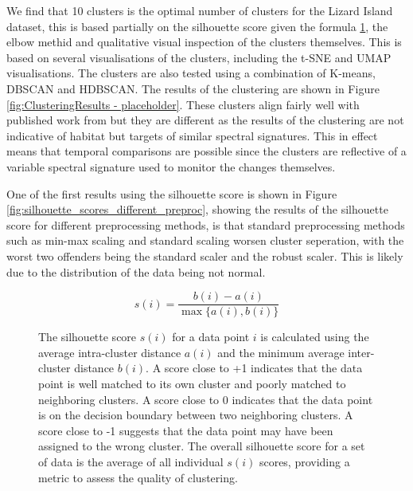 \documentclass[journal,article,submit,pdftex,moreauthors]{Definitions/mdpi}
\begin{document}
We find that 10 clusters is the optimal number of clusters for the Lizard Island dataset, this is based partially on the silhouette score \cite{rousseeuw1987silhouettes} given the formula \ref{fig:silhouette_score}, the elbow methid and qualitative visual inspection of the clusters themselves. This is based on several visualisations of the clusters, including the t-SNE and UMAP visualisations. 
The clusters are also tested using a combination of K-means, DBSCAN and HDBSCAN. The results of the clustering are shown in Figure \ref{fig:ClusteringResults - placeholder}. These clusters align fairly well with published work from \citep{Kennedy2021} but they are different
as the results of the clustering are not indicative of habitat but targets of similar spectral signatures. This in effect means that temporal comparisons are possible since the clusters are reflective of a variable spectral signature used to monitor the changes themselves.

One of the first results using the silhouette score is shown in Figure \ref{fig:silhouette_scores_different_preproc}, showing the results of the silhouette score for different preprocessing methods,  is that standard preprocessing methods such as min-max scaling and standard scaling worsen cluster seperation, with the worst two offenders being the standard scaler and the robust scaler.
This is likely due to the distribution of the data being not normal. %



\begin{figure}[ht]
	\centering
	\[
	s(i) = \frac{b(i) - a(i)}{\max\{a(i), b(i)\}}
	\]
	\caption{The silhouette score $s(i)$ for a data point $i$ is calculated using the average intra-cluster distance $a(i)$ and the minimum average inter-cluster distance $b(i)$. A score close to +1 indicates that the data point is well matched to its own cluster and poorly matched to neighboring clusters. A score close to 0 indicates that the data point is on the decision boundary between two neighboring clusters. A score close to -1 suggests that the data point may have been assigned to the wrong cluster. The overall silhouette score for a set of data is the average of all individual $s(i)$ scores, providing a metric to assess the quality of clustering.}
	\label{fig:silhouette_score}
\end{figure}
\end{document}
